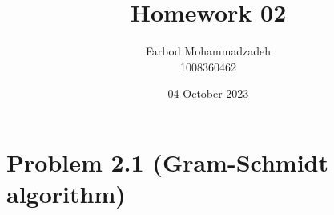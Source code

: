 \documentclass[20pt]{article}
\title{Homework 02}
\author{Farbod Mohammadzadeh\\1008360462}
\date{04 October 2023}
\begin{document}
\Large
\maketitle

\newpage

\section*{Problem 2.1 (Gram-Schmidt algorithm)}
\end{document}

